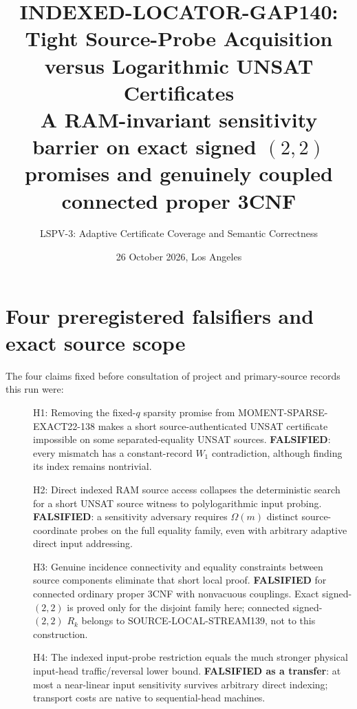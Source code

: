 \documentclass[11pt]{article}
\title{INDEXED-LOCATOR-GAP140:\\Tight Source-Probe Acquisition versus Logarithmic UNSAT Certificates\\\large A RAM-invariant sensitivity barrier on exact signed $(2,2)$ promises and genuinely coupled connected proper 3CNF}
\author{LSPV-3: Adaptive Certificate Coverage and Semantic Correctness}
\date{26 October 2026, Los Angeles}
\begin{document}
\maketitle
\begin{center}
\end{center}

\section{Four preregistered falsifiers and exact source scope}
The four claims fixed before consultation of project and primary-source records this run were:
\begin{description}
\item[] H1: Removing the fixed-$q$ sparsity promise from MOMENT-SPARSE-EXACT22-138 makes a short source-authenticated UNSAT certificate impossible on some separated-equality UNSAT sources. \textbf{FALSIFIED}: every mismatch has a constant-record $W_1$ contradiction, although finding its index remains nontrivial.
\item[] H2: Direct indexed RAM source access collapses the deterministic search for a short UNSAT source witness to polylogarithmic input probing. \textbf{FALSIFIED}: a sensitivity adversary requires $\Omega(m)$ distinct source-coordinate probes on the full equality family, even with arbitrary adaptive direct input addressing.
\item[] H3: Genuine incidence connectivity and equality constraints between source components eliminate that short local proof. \textbf{FALSIFIED} for connected ordinary proper 3CNF with nonvacuous couplings. Exact signed-$(2,2)$ is proved only for the disjoint family here; connected signed-$(2,2)$ $R_k$ belongs to SOURCE-LOCAL-STREAM139, not to this construction.
\item[] H4: The indexed input-probe restriction equals the much stronger physical input-head traffic/reversal lower bound. \textbf{FALSIFIED as a transfer}: at most a near-linear input sensitivity survives arbitrary direct indexing; transport costs are native to sequential-head machines.
\end{description}
\end{document}
